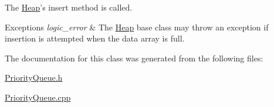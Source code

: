 \begin{DoxyEnumerate}
\item \-The \hyperlink{class_heap}{\-Heap}'s insert method is called.
\end{DoxyEnumerate}


\begin{DoxyExceptions}{\-Exceptions}
{\em logic\-\_\-error} & \-The \hyperlink{class_heap}{\-Heap} base class may throw an exception if insertion is attempted when the data array is full.\\
\hline
\end{DoxyExceptions}

\begin{DoxyCode}
\end{DoxyCode}
 

\-The documentation for this class was generated from the following files\-:\begin{DoxyCompactItemize}
\item 
\hyperlink{_priority_queue_8h}{\-Priority\-Queue.\-h}\item 
\hyperlink{_priority_queue_8cpp}{\-Priority\-Queue.\-cpp}\end{DoxyCompactItemize}
